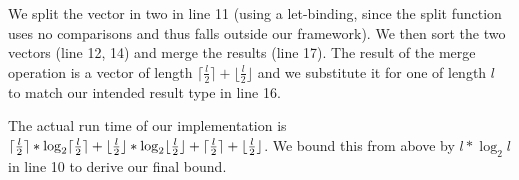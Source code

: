 We split the vector in two in line 11 (using a let-binding, since the split function uses no comparisons and thus falls outside our framework). We then sort the two vectors (line 12, 14) and merge the results (line 17). The result of the merge operation is a vector of length $\lceil \frac l 2 \rceil + \lfloor \frac l 2 \rfloor$ and we substitute it for one of length $l$ to match our intended result type in line 16.

The actual run time of our implementation is $\lceil \frac{l}{2} \rceil * \log_2 \lceil \frac{l}{2} \rceil + \lfloor \frac{l}{2} \rfloor * \log_2 \lfloor \frac{l}{2} \rfloor + \lceil \frac{l}{2} \rceil + \lfloor \frac{l}{2} \rfloor$. We bound this from above by $l * \log_2 l$ in line 10 to derive our final bound.
